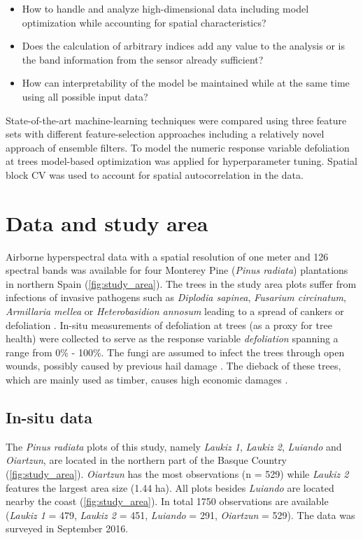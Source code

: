 \documentclass[review]{elsarticle}
\begin{document}
\begin{itemize}
	\item How to handle and analyze high-dimensional data including model optimization while accounting for spatial characteristics?
	\item Does the calculation of arbitrary indices add any value to the analysis or is the band information from the sensor already sufficient?
	\item How can interpretability of the model be maintained while at the same time using all possible input data?
\end{itemize}

\noindent State-of-the-art machine-learning techniques were compared using three feature sets with different feature-selection approaches including a relatively novel approach of ensemble filters.
To model the numeric response variable defoliation at trees model-based optimization was applied for hyperparameter tuning.
Spatial block \ac{CV} was used to account for spatial autocorrelation in the data.

\section{Data and study area}
\noindent Airborne hyperspectral data with a spatial resolution of one meter and 126 spectral bands was available for four Monterey Pine (\textit{Pinus radiata}) plantations in northern Spain (\autoref{fig:study_area}).
The trees in the study area plots suffer from infections of invasive pathogens such as \textit{Diplodia sapinea}, \textit{Fusarium circinatum}, \textit{Armillaria mellea} or \textit{Heterobasidion annosum} leading to a spread of cankers or defoliation \citep{mesanza2016, iturritxa2017}.
In-situ measurements of defoliation at trees (as a proxy for tree health) were collected to serve as the response variable \textit{defoliation} spanning a range from 0\% - 100\%.
The fungi are assumed to infect the trees through open wounds, possibly caused by previous hail damage \citep{iturritxa2014}.
The dieback of these trees, which are mainly used as timber, causes high economic damages \citep{ganley2009}.

\subsection{In-situ data}

\noindent The \textit{Pinus radiata} plots of this study, namely \textit{Laukiz 1}, \textit{Laukiz 2}, \textit{Luiando} and \textit{Oiartzun}, are located in the northern part of the Basque Country (\autoref{fig:study_area}).
\textit{Oiartzun} has the most observations (n = 529) while \textit{Laukiz 2} features the largest area size (1.44 ha).
All plots besides \textit{Luiando} are located nearby the coast (\autoref{fig:study_area}).
In total 1750 observations are available (\textit{Laukiz 1} = 479, \textit{Laukiz 2} = 451, \textit{Luiando} = 291, \textit{Oiartzun} = 529).
The data was surveyed in September 2016.
\end{document}
